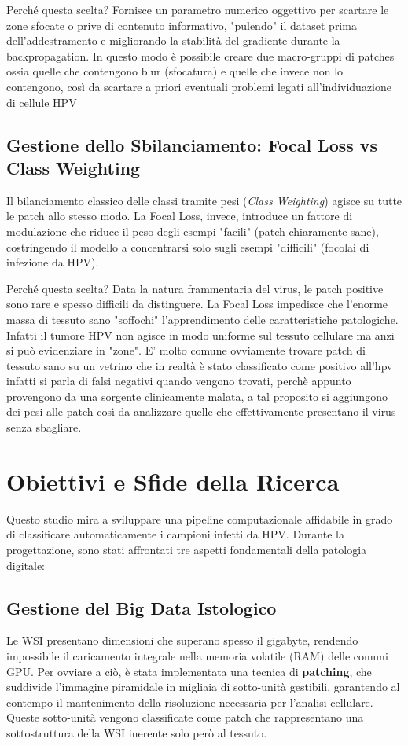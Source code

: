     Perché questa scelta? Fornisce un parametro numerico oggettivo per scartare le zone sfocate o prive di contenuto informativo, "pulendo" il dataset prima dell'addestramento e migliorando la stabilità del gradiente durante la backpropagation. In questo modo è possibile creare due macro-gruppi di patches ossia quelle che contengono blur (sfocatura) e quelle che invece non lo contengono, così da scartare a priori eventuali problemi legati all'individuazione di cellule HPV

\subsection{Gestione dello Sbilanciamento: Focal Loss vs Class Weighting} Il bilanciamento classico delle classi tramite pesi (\textit{Class Weighting}) agisce su tutte le patch allo stesso modo. La Focal Loss, invece, introduce un fattore di modulazione che riduce il peso degli esempi "facili" (patch chiaramente sane), costringendo il modello a concentrarsi solo sugli esempi "difficili" (focolai di infezione da HPV).

    Perché questa scelta? Data la natura frammentaria del virus, le patch positive sono rare e spesso difficili da distinguere. La Focal Loss impedisce che l'enorme massa di tessuto sano "soffochi" l'apprendimento delle caratteristiche patologiche. Infatti il tumore HPV non agisce in modo uniforme sul tessuto cellulare ma anzi si può evidenziare in "zone". E' molto comune ovviamente trovare patch di tessuto sano su un vetrino che in realtà è stato classificato come positivo all'hpv infatti si parla di falsi negativi quando vengono trovati, perchè appunto provengono da una sorgente clinicamente malata, a tal proposito si aggiungono dei pesi alle patch così da analizzare quelle che effettivamente presentano il virus senza sbagliare.


\section{Obiettivi e Sfide della Ricerca} Questo studio mira a sviluppare una pipeline computazionale affidabile in grado di classificare automaticamente i campioni infetti da HPV. Durante la progettazione, sono stati affrontati tre aspetti fondamentali della patologia digitale:

\subsection{Gestione del Big Data Istologico} Le WSI presentano dimensioni che superano spesso il gigabyte, rendendo impossibile il caricamento integrale nella memoria volatile (RAM) delle comuni GPU. Per ovviare a ciò, è stata implementata una tecnica di \textbf{patching}, che suddivide l'immagine piramidale in migliaia di sotto-unità gestibili, garantendo al contempo il mantenimento della risoluzione necessaria per l'analisi cellulare. Queste sotto-unità vengono classificate come patch che rappresentano una sottostruttura della WSI inerente solo però al tessuto.

